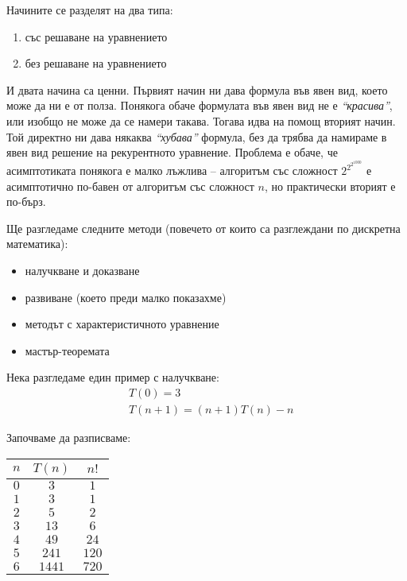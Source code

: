 \documentclass{article}
\theoremstyle{definition}
\theoremstyle{plain}
\theoremstyle{remark}
\theoremstyle{definition}
\begin{document}
Начините се разделят на два типа:
\begin{enumerate}
    \item със решаване на уравнението
    \item без решаване на уравнението
\end{enumerate}

И двата начина са ценни.
Първият начин ни дава формула във явен вид, което може да ни е от полза.
Понякога обаче формулата във явен вид не е \textit{``красива''}, или изобщо не може да се намери такава.
Тогава идва на помощ вторият начин.
Той директно ни дава някаква \textit{``хубава''} формула, без да трябва да намираме в явен вид решение на рекурентното уравнение.
Проблема е обаче, че асимптотиката понякога е малко лъжлива -- алгоритъм със сложност $2^{2^{2^{1000}}}$ е асимптотично по-бавен от алгоритъм със сложност $n$, но практически вторият е по-бърз.

\pagebreak

Ще разгледаме следните методи (повечето от които са разглеждани по дискретна математика):
\begin{itemize}
    \item налучкване и доказване
    \item развиване (което преди малко показахме)
    \item методът с характеристичното уравнение
    \item мастър-теоремата
\end{itemize}

Нека разгледаме един пример с налучкване:
\begin{align*}
     & T(0) = 3                   \\
     & T(n + 1) = (n + 1)T(n) - n
\end{align*}

Започваме да разписваме:
\begin{center}
    \begin{tabular}{| c | c | c |}
        \hline
        $n$ & $T(n)$ & $n!$  \\
        \hline
        $0$ & $3$    & $1$   \\
        \hline
        $1$ & $3$    & $1$   \\
        \hline
        $2$ & $5$    & $2$   \\
        \hline
        $3$ & $13$   & $6$   \\
        \hline
        $4$ & $49$   & $24$  \\
        \hline
        $5$ & $241$  & $120$ \\
        \hline
        $6$ & $1441$ & $720$ \\
        \hline
    \end{tabular}
\end{center}
\end{document}
